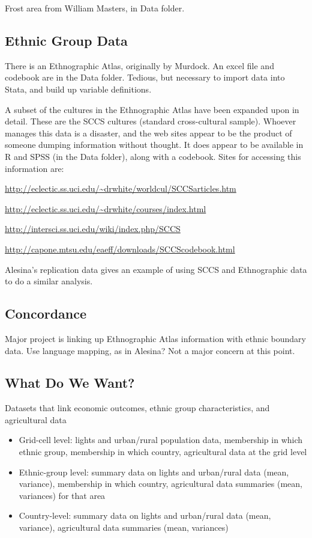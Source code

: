 \documentclass[10pt]{article}
\begin{document}
Frost area from William Masters, in Data folder.

\subsection{Ethnic Group Data}
There is an Ethnographic Atlas, originally by Murdock. An excel file and codebook are in the Data folder. Tedious, but necessary to import data into Stata, and build up variable definitions. 

A subset of the cultures in the Ethnographic Atlas have been expanded upon in detail. These are the SCCS cultures (standard cross-cultural sample). Whoever manages this data is a disaster, and the web sites appear to be the product of someone dumping information without thought. It does appear to be available in R and SPSS (in the Data folder), along with a codebook. Sites for accessing this information are:

\url{http://eclectic.ss.uci.edu/~drwhite/worldcul/SCCSarticles.htm}

\url{http://eclectic.ss.uci.edu/~drwhite/courses/index.html}

\url{http://intersci.ss.uci.edu/wiki/index.php/SCCS}

\url{http://capone.mtsu.edu/eaeff/downloads/SCCScodebook.html}

Alesina's replication data gives an example of using SCCS and Ethnographic data to do a similar analysis. 

\subsection{Concordance}
Major project is linking up Ethnographic Atlas information with ethnic boundary data. Use language mapping, as in Alesina? Not a major concern at this point. 

\subsection{What Do We Want?}
Datasets that link economic outcomes, ethnic group characteristics, and agricultural data
\begin{itemize}
	\item Grid-cell level: lights and urban/rural population data, membership in which ethnic group, membership in which country, agricultural data at the grid level
	\item Ethnic-group level: summary data on lights and urban/rural data (mean, variance), membership in which country, agricultural data summaries (mean, variances) for that area
	\item Country-level: summary data on lights and urban/rural data (mean, variance), agricultural data summaries (mean, variances)
\end{itemize}
\end{document}
